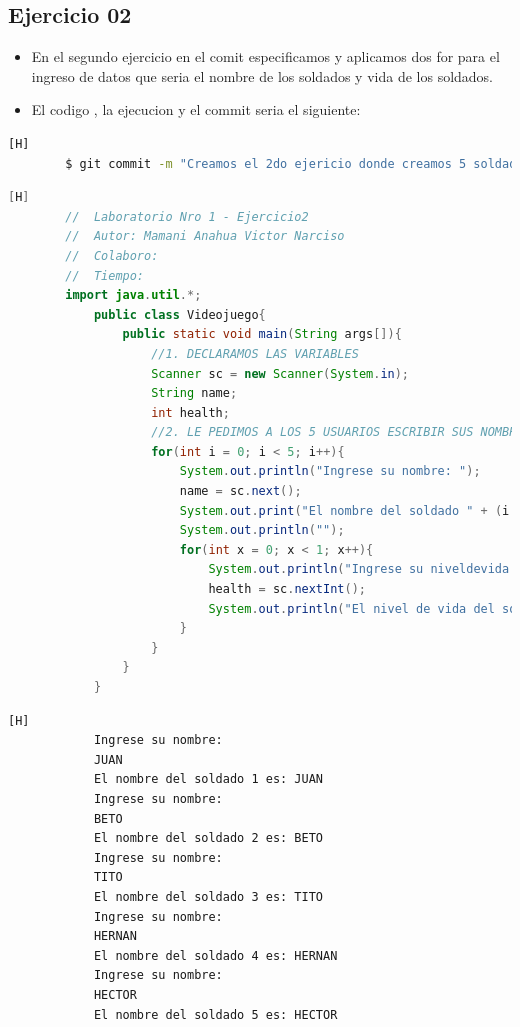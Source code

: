 \documentclass{article}
\begin{document}
	\subsection{Ejercicio 02}
	\begin{itemize}	
		\item En el segundo ejercicio en el comit especificamos y aplicamos dos for para el ingreso de datos que seria el nombre de los soldados y vida de los soldados.
		\item El codigo , la ejecucion y el commit seria el siguiente:
	\end{itemize}
	\begin{lstlisting}[language=bash,caption={Commit}][H]
		$ git commit -m "Creamos el 2do ejericio donde creamos 5 soldados y imprimimos sus nombres y su vida y tambien borramos el archivo Sumadig.java ya que no lo necesitamos"
	\end{lstlisting}	
	\begin{lstlisting}[language=java,caption={Las lineas de codigo del Ejercicio02 serian}][H]
		//  Laboratorio Nro 1 - Ejercicio2
		//  Autor: Mamani Anahua Victor Narciso
		//  Colaboro:
		//  Tiempo: 
		import java.util.*;
			public class Videojuego{
				public static void main(String args[]){
					//1. DECLARAMOS LAS VARIABLES
					Scanner sc = new Scanner(System.in);
					String name;
					int health;
					//2. LE PEDIMOS A LOS 5 USUARIOS ESCRIBIR SUS NOMBRES Y SU NIVEL DE VIDA	
					for(int i = 0; i < 5; i++){
						System.out.println("Ingrese su nombre: ");
						name = sc.next();
						System.out.print("El nombre del soldado " + (i + 1) + " es: " + name);
						System.out.println("");
						for(int x = 0; x < 1; x++){
							System.out.println("Ingrese su niveldevida: ");
							health = sc.nextInt();
							System.out.println("El nivel de vida del soldado " + (i + 1) + " es: " + health);
						}
					}
				}
			}
	\end{lstlisting}
	\begin{lstlisting}[language=bash,caption={La ejecucion dada:}][H]
			Ingrese su nombre: 
			JUAN
			El nombre del soldado 1 es: JUAN
			Ingrese su nombre: 
			BETO
			El nombre del soldado 2 es: BETO
			Ingrese su nombre: 
			TITO
			El nombre del soldado 3 es: TITO
			Ingrese su nombre: 
			HERNAN
			El nombre del soldado 4 es: HERNAN
			Ingrese su nombre: 
			HECTOR
			El nombre del soldado 5 es: HECTOR
	\end{lstlisting}
\end{document}
